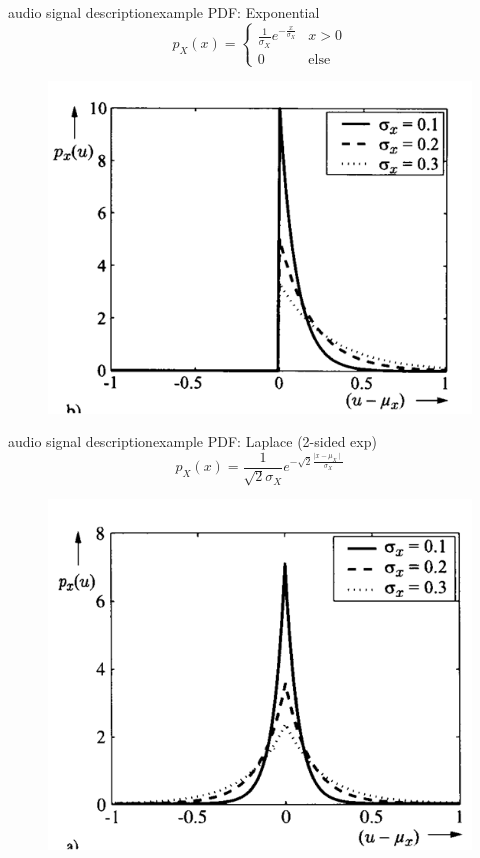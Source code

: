 \begin{frame}{audio signal description}{example PDF: Exponential}
	\begin{equation}
		p_X(x)= \left\lbrace  \begin{array}{ll}
		  \frac{1}{\sigma_X}e^{-\frac{x}{\sigma_X}} & x >0 \\
		  0 & \textrm{else} 
	\end{array}\right.
	\end{equation}
    \begin{figure}
		\centering
			\includegraphics[scale=.5]{graph/expdist}
	\end{figure}
\end{frame}	
	
\begin{frame}{audio signal description}{example PDF: Laplace (2-sided exp)}
	\begin{equation}
		p_X(x)= \frac{1}{\sqrt{2}\sigma_X}e^{-\sqrt{2}\frac{\mid x-\mu_X\mid}{\sigma_X}}
	\end{equation}
	\begin{figure}
		\centering
			\includegraphics[scale=.5]{graph/laplacedist}
	\end{figure}
\end{frame}	

